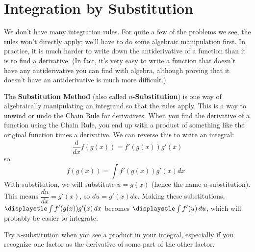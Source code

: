 \section{Integration by Substitution}
\label{sec:substitution}
We don't have many integration rules. For quite a few of the problems we see, the rules won't directly apply; we'll have to do some algebraic manipulation first. In practice, it is much harder to write down the antiderivative of a function than it is to find a derivative. (In fact, it's very easy to write a function that doesn't have any antiderivative you can find with algebra, although proving that it doesn't have an antiderivative is much more difficult.)

The {\bf Substitution Method} (also called $u${\bf-Substitution}) is one way of algebraically manipulating an integrand so that the rules apply. This is a way to unwind or undo the Chain Rule for derivatives. When you find the derivative of a function using the Chain Rule, you end up with a product of something like the original function times a derivative. We can reverse this to write an integral:
$$\dfrac{d}{dx}f(g(x))=f'(g(x))g'(x)$$
so
$$f(g(x))=\int f'(g(x))g'(x)dx \enspace $$
With substitution, we will substitute $u=g(x)$ (hence the name $u$-substitution). This means $\dfrac{du}{dx}=g'(x)$, so $du=g'(x)dx$. Making these substitutions, $\displaystle\int f'(g(x))g'(x)\,dx$ becomes $\displaystle\int f'(u)\,du$, which will probably be easier to integrate.

Try $u$-substitution when you see a product in your integral, especially if you recognize one factor as the derivative of some part of the other factor.


